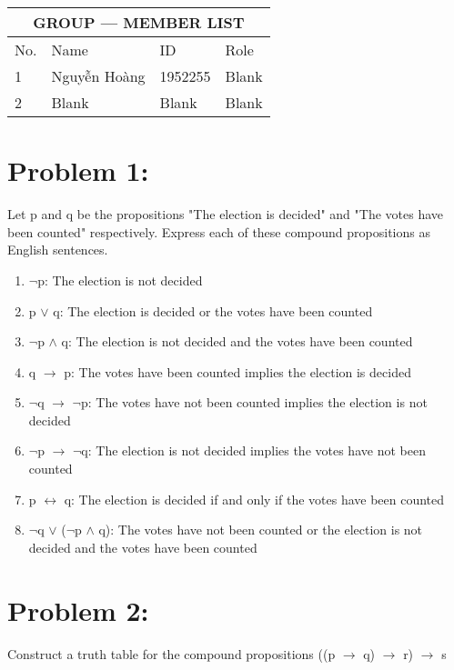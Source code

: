 \documentclass[12pt,en,a4paper]{article}
\begin{document}
	\begin{table}[]
		\centering
		\begin{tabular}{|p{}|p{}|p{}|p{}|}
			\hline
			\multicolumn{4}{|c|}{GROUP --- MEMBER LIST} \\
			\hline
			No. & Name & ID & Role \\
			\hline
			1 & Nguyễn Hoàng & 1952255 & Blank \\
			\hline
			2 & Blank & Blank & Blank \\
			\hline
		\end{tabular}
	\end{table}
	\section*{Problem 1:}
	Let p and q be the propositions "The election is decided" and "The votes have been counted" respectively.
	Express each of these compound propositions as English sentences.
	
	\begin{enumerate}
		\item $\neg$p: The election is not decided
		\item p $\vee$ q: The election is decided or the votes have been counted
		\item $\neg$p $\wedge$ q: The election is not decided and the votes have been counted
		\item q $\rightarrow$ p: The votes have been counted implies the election is decided
		\item $\neg$q $\rightarrow$ $\neg$p: The votes have not been counted implies the election is not decided
		\item $\neg$p $\rightarrow$ $\neg$q: The election is not decided implies the votes have not been counted
		\item p $\leftrightarrow$ q: The election is decided if and only if the votes have been counted
		\item $\neg$q $\vee$ ($\neg$p $\wedge$ q): The votes have not been counted or the election is not decided and the votes have been counted
	\end{enumerate}
\newpage
{}
	\section*{Problem 2:}
	Construct a truth table for the compound propositions ((p $\rightarrow$ q) $\rightarrow$ r) $\rightarrow$ s
	
\end{document}
